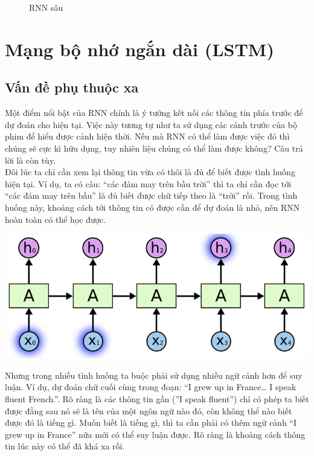 \begin{itemize}
\begin{center}
\begin{figure}[htp]
\begin{center}
    \end{center}
    \caption{RNN sâu \cite{rnn-basic}}
    \end{figure}
    \end{center}
\end{itemize}


\section{Mạng bộ nhớ ngắn dài (LSTM)}
\subsection{Vấn đề phụ thuộc xa}
Một điểm nổi bật của RNN chính là ý tưởng kết nối các thông tin phía trước để dự đoán cho hiện tại. Việc này tương tự như ta sử dụng các cảnh trước của bộ phim để hiểu được cảnh hiện thời. Nếu mà RNN có thể làm được việc đó thì chúng sẽ cực kì hữu dụng, tuy nhiên liệu chúng có thể làm được không? Câu trả lời là còn tùy.\\
Đôi lúc ta chỉ cần xem lại thông tin vừa có thôi là đủ để biết được tình huống hiện tại. Ví dụ, ta có câu: “các đám may trên bầu trời” thì ta chỉ cần đọc tới “các đám may trên bầu” là đủ biết được chữ tiếp theo là “trời” rồi. Trong tình huống này, khoảng cách tới thông tin có được cần để dự đoán là nhỏ, nên RNN hoàn toàn có thể học được.
\begin{center}
    \includegraphics[scale=.3]{image/chapter6/ptx1.png}
    \begin{figure}[htp]
    \begin{center}
     
    \end{center}
    \end{figure}
\end{center}
Nhưng trong nhiều tình huống ta buộc phải sử dụng nhiều ngữ cảnh hơn để suy luận. Ví dụ, dự đoán chữ cuối cùng trong đoạn: “I grew up in France… I speak fluent French.”. Rõ ràng là các thông tin gần (”I speak fluent”) chỉ có phép ta biết được đằng sau nó sẽ là tên của một ngôn ngữ nào đó, còn không thể nào biết được đó là tiếng gì. Muốn biết là tiếng gì, thì ta cần phải có thêm ngữ cảnh “I grew up in France” nữa mới có thể suy luận được. Rõ ràng là khoảng cách thông tin lúc này có thể đã khá xa rồi.\\

